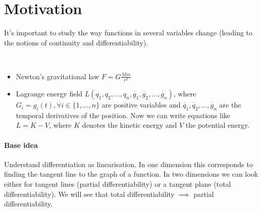 \section{Motivation}
It's important to study the way functions in several variables change (leading to the notions of continuity and differentiability). 
\begin{exam}\ 
 \begin{itemize}
  \item Newton's gravitational law $F=G\frac{Mm}{r^2}$
  \item Lagrange energy field $L(q_1, q_2,\ldots, q_n, \dot{g_1}, \dot{g_2}, \ldots, \dot{g_n})$, where $G_i=g_i(t), \forall i\in\{1, \ldots, n\}$ are positive variables and $\dot{q_1}, \dot{q_2}, \ldots, \dot{g_n}$ are the temporal derivatives of the position. Now we can write equations like $L=K-V$, where $K$ denotes the kinetic energy and $V$ the potential energy. 
 \end{itemize}
\end{exam}
\paragraph{Base idea}
Understand differentiation as linearisation. In one dimension this corresponds to finding the tangent line to the graph of a function. In two dimensions we can look either for tangent lines (partial differentiability) or a tangent plane (total differentiability). We will see that total differentiability $\implies$ partial differentiability.
